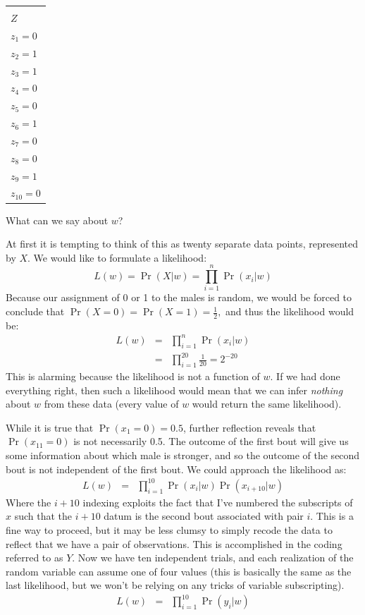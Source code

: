 \documentclass[11pt]{article}
\begin{document}
\begin{center}
\begin{tabular}{|l|}
\hline
\end{tabular}
\begin{tabular}{|l|}
\hline\\
$Z$\\
\hline$z_1 = 0$   \\
$z_2 = 1$  \\
$z_3 = 1$  \\
$z_4 = 0$  \\
$z_5 = 0$  \\
$z_6 = 1$  \\
$z_7 = 0$  \\
$z_8 = 0$  \\
$z_9 = 1$  \\
$z_{10} = 0$  \\
\hline\end{tabular}

\end{center}
What can we say about $w$?

At first it is tempting to think of this as twenty separate data points, represented by $X$.
We would like to formulate a likelihood:
$$L(w) = \Pr(X|w) = \prod_{i=1}^{n}\Pr(x_i|w)$$
Because our assignment of 0 or 1 to the males is random, we would be forced to conclude that $\Pr(X=0) = \Pr(X=1) = \frac{1}{2},$ and thus the likelihood would be:
\begin{eqnarray*} 
	L(w) & = & \prod_{i=1}^{n}\Pr(x_i|w) \\
	& = & \prod_{i=1}^{20}\frac{1}{20} =  2^{-20}
\end{eqnarray*} 
This is alarming because the likelihood is not a function of $w$.  
If we had done everything right, then such a likelihood would mean that we can infer {\em nothing} about $w$ from these data (every value of $w$ would return the same likelihood).

While it is true that $\Pr(x_1=0)=0.5$, further reflection reveals that $\Pr(x_{11}=0)$ is not necessarily 0.5.  
The outcome of the first bout will give us some information about which male is stronger, and so the outcome of the second bout is not independent of the first bout.
We could approach the likelihood as:
\begin{eqnarray*} 
	L(w) & = & \prod_{i=1}^{10}\Pr(x_i|w)\Pr(x_{i+10}|w)
\end{eqnarray*} 
Where the $i+10$ indexing exploits the fact that I've numbered the subscripts of $x$ such that the $i+10$ datum is the second bout associated with pair $i$.
This is a fine way to proceed, but it may be less clumsy to simply recode the data to reflect that we have a pair of observations.
This is accomplished in the coding referred to as $Y$.  
Now we have ten independent trials, and each realization of the random variable can assume one of four values (this is basically the same as the last likelihood, but we won't be relying on any tricks of variable subscripting).
\begin{eqnarray*} 
	L(w) & = & \prod_{i=1}^{10}\Pr(y_i|w)
\end{eqnarray*}
\end{document}
